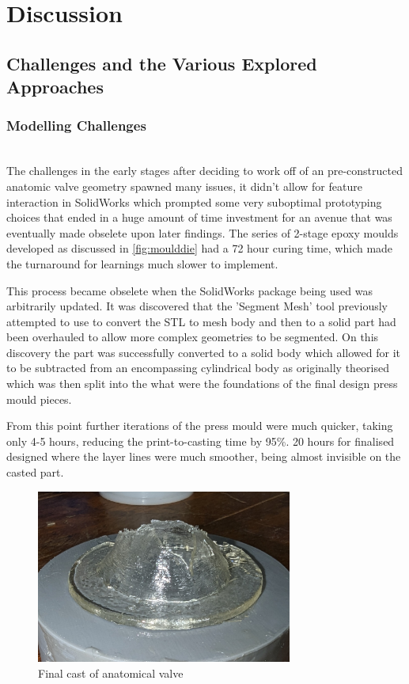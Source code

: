 \chapter{Discussion}\label{ch:Discussion}
\synopsisDiscussion

\section{Challenges and the Various Explored Approaches}
\subsection{Modelling Challenges}
\\
The challenges in the early stages after deciding to work off of an pre-constructed anatomic valve geometry spawned many issues, it didn't allow for feature interaction in SolidWorks which prompted some very suboptimal prototyping choices that ended in a huge amount of time investment for an avenue that was eventually made obselete upon later findings. The series of 2-stage epoxy moulds developed as discussed in \cref{fig:moulddie} had a 72 hour curing time, which made the turnaround for learnings much slower to implement.

This process became obselete when the SolidWorks package being used was arbitrarily updated. It was discovered that the 'Segment Mesh' tool previously attempted to use to convert the STL to mesh body and then to a solid part had been overhauled to allow more complex geometries to be segmented. On this discovery the part was successfully converted to a solid body which allowed for it to be subtracted from an encompassing cylindrical body as originally theorised which was then split into the what were the foundations of the final design press mould pieces.

From this point further iterations of the press mould were much quicker, taking only 4-5 hours, reducing the print-to-casting time by 95\%. 20 hours for finalised designed where the layer lines were much smoother, being almost invisible on the casted part.
\begin{figure}[H]
    \centering
    \includegraphics[width=0.75\textwidth]{figures/latercastnice.jpg}
    \caption{Final cast of anatomical valve}
    \label{fig:cast1}
\end{figure}

